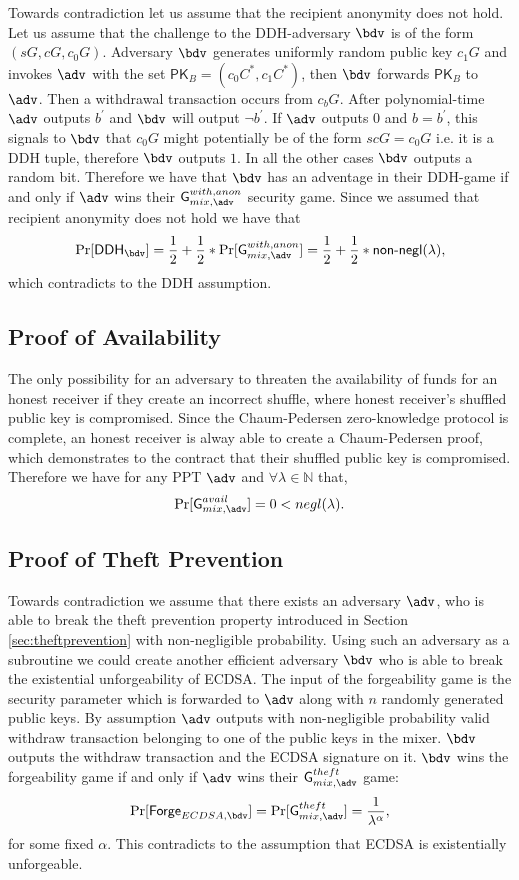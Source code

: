 \documentclass[conference, compsoc]{IEEEtran}
\theoremstyle{definition}
\begin{document}
Towards contradiction let us assume that the recipient anonymity does not hold. Let us assume that the challenge to the DDH-adversary $\bdv$ is of the form $(sG,cG,c_{0}G)$. Adversary $\bdv$ generates uniformly random public key $c_{1}G$ and invokes $\adv$ with the set $\textsf{PK}_{B}=(c_{0}C^{*}, c_{1}C^{*})$, then $\bdv$ forwards $\textsf{PK}_{B}$ to $\adv$. Then a withdrawal transaction occurs from $c_{b}G$. After polynomial-time $\adv$ outputs $b^{'}$ and $\bdv$ will output $\lnot b^{'}$. If $\adv$ outputs $0$ and $b=b^{'}$, this signals to $\bdv$ that $c_{0}G$ might potentially be of the form $scG=c_{0}G$  i.e. it is a DDH tuple, therefore $\bdv$ outputs $1$. In all the other cases $\bdv$ outputs a random bit. Therefore we have that $\bdv$ has an adventage in their DDH-game if and only if $\adv$ wins their $\textsf{G}^{with, anon}_{mix, \adv}$ security game. Since we assumed that recipient anonymity does not hold we have that $$\Pr[\textsf{DDH}_{\bdv}]=\frac{1}{2}+\frac{1}{2}*\Pr[\textsf{G}^{with, anon}_{mix, \adv}]=\frac{1}{2}+\frac{1}{2}*\textsf{non-negl}(\lambda),$$ which contradicts to the DDH assumption.
	
\subsection{Proof of Availability}  \label{appendavail}
The only possibility for an adversary to threaten the availability of funds for an honest receiver if they create an incorrect shuffle, where honest receiver's shuffled public key is compromised. Since the Chaum-Pedersen zero-knowledge protocol is complete, an honest receiver is alway able to create a Chaum-Pedersen proof, which demonstrates to the contract that their shuffled public key is compromised. Therefore we have for any PPT $\adv$ and $\forall \lambda \in \mathbb{N}$ that, $$\Pr[\textsf{G}^{avail}_{mix, \adv}]=0<negl(\lambda).$$
	
\subsection{Proof of Theft Prevention} \label{appendtheft}
Towards contradiction we assume that there exists an adversary $\adv$, who is able to break the theft prevention property introduced in Section \ref{sec:theftprevention} with non-negligible probability. Using such an adversary as a subroutine we could create another efficient adversary $\bdv$ who is able to break the existential unforgeability of ECDSA. The input of the forgeability game is the security parameter which is forwarded to $\adv$ along with $n$ randomly generated public keys. By assumption $\adv$ outputs with non-negligible probability valid withdraw transaction belonging to one of the public keys in the mixer. $\bdv$ outputs the withdraw transaction and the ECDSA signature on it. $\bdv$ wins the forgeability game if and only if $\adv$ wins their $\textsf{G}^{theft}_{mix,\adv}$ game: $$\Pr[\textsf{Forge}_{ECDSA,\bdv}]=\Pr[\textsf{G}^{theft}_{mix, \adv}]=\frac{1}{\lambda^\alpha}, $$ for some fixed $\alpha$. This contradicts to the assumption that ECDSA is existentially unforgeable.
		
\end{document}

